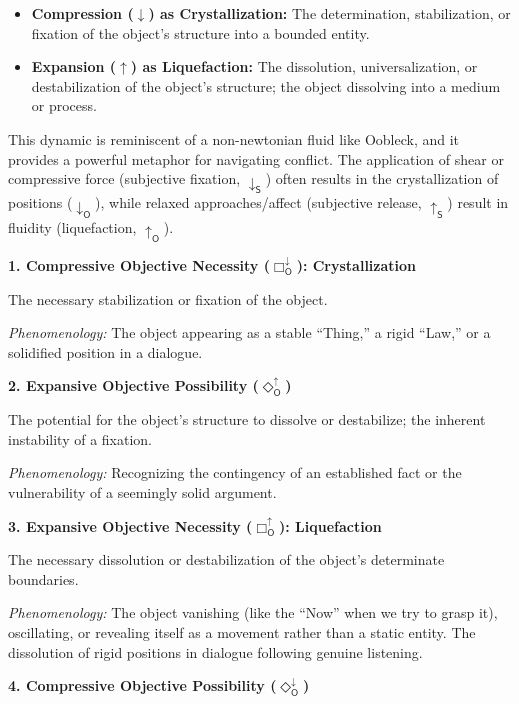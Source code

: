 \documentclass[12pt]{book}
\newcommand{\OBoxUp}{\Box_{\mathsf{O}}^{\uparrow}}
\newcommand{\OBoxDown}{\Box_{\mathsf{O}}^{\downarrow}}
\newcommand{\ODiaUp}{\Diamond_{\mathsf{O}}^{\uparrow}}
\newcommand{\ODiaDown}{\Diamond_{\mathsf{O}}^{\downarrow}}
\begin{document}
\begin{itemize}
    \item \textbf{Compression ($\downarrow$) as Crystallization:} The determination, stabilization, or fixation of the object's structure into a bounded entity.
    \item \textbf{Expansion ($\uparrow$) as Liquefaction:} The dissolution, universalization, or destabilization of the object's structure; the object dissolving into a medium or process.
\end{itemize}

This dynamic is reminiscent of a non-newtonian fluid like Oobleck, and it provides a powerful metaphor for navigating conflict. The application of shear or compressive force (subjective fixation, $\downarrow_{\mathsf{S}}$) often results in the crystallization of positions ($\downarrow_{\mathsf{O}}$), while relaxed approaches/affect (subjective release, $\uparrow_{\mathsf{S}}$) result in fluidity (liquefaction, $\uparrow_{\mathsf{O}}$).

\bigskip

\noindent\textbf{1. Compressive Objective Necessity ($\OBoxDown$): Crystallization}

The necessary stabilization or fixation of the object.

\textit{Phenomenology:} The object appearing as a stable ``Thing,'' a rigid ``Law,'' or a solidified position in a dialogue.

\bigskip

\noindent\textbf{2. Expansive Objective Possibility ($\ODiaUp$)}

The potential for the object's structure to dissolve or destabilize; the inherent instability of a fixation.

\textit{Phenomenology:} Recognizing the contingency of an established fact or the vulnerability of a seemingly solid argument.

\bigskip

\noindent\textbf{3. Expansive Objective Necessity ($\OBoxUp$): Liquefaction}

The necessary dissolution or destabilization of the object's determinate boundaries.

\textit{Phenomenology:} The object vanishing (like the ``Now'' when we try to grasp it), oscillating, or revealing itself as a movement rather than a static entity. The dissolution of rigid positions in dialogue following genuine listening.

\bigskip

\noindent\textbf{4. Compressive Objective Possibility ($\ODiaDown$)}
\end{document}
